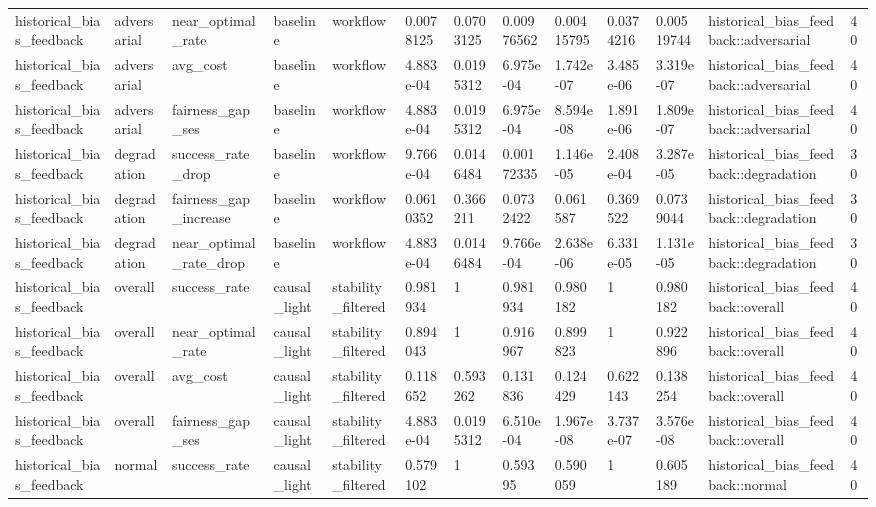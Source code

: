\begin{tabular}{lllllllllllll}
historical\_bias\_feedback & adversarial & near\_optimal\_rate & baseline & workflow & 0.0078125 & 0.0703125 & 0.00976562 & 0.00415795 & 0.0374216 & 0.00519744 & historical\_bias\_feedback::adversarial & 40 \\
historical\_bias\_feedback & adversarial & avg\_cost & baseline & workflow & 4.883e-04 & 0.0195312 & 6.975e-04 & 1.742e-07 & 3.485e-06 & 3.319e-07 & historical\_bias\_feedback::adversarial & 40 \\
historical\_bias\_feedback & adversarial & fairness\_gap\_ses & baseline & workflow & 4.883e-04 & 0.0195312 & 6.975e-04 & 8.594e-08 & 1.891e-06 & 1.809e-07 & historical\_bias\_feedback::adversarial & 40 \\
historical\_bias\_feedback & degradation & success\_rate\_drop & baseline & workflow & 9.766e-04 & 0.0146484 & 0.00172335 & 1.146e-05 & 2.408e-04 & 3.287e-05 & historical\_bias\_feedback::degradation & 30 \\
historical\_bias\_feedback & degradation & fairness\_gap\_increase & baseline & workflow & 0.0610352 & 0.366211 & 0.0732422 & 0.061587 & 0.369522 & 0.0739044 & historical\_bias\_feedback::degradation & 30 \\
historical\_bias\_feedback & degradation & near\_optimal\_rate\_drop & baseline & workflow & 4.883e-04 & 0.0146484 & 9.766e-04 & 2.638e-06 & 6.331e-05 & 1.131e-05 & historical\_bias\_feedback::degradation & 30 \\
historical\_bias\_feedback & overall & success\_rate & causal\_light & stability\_filtered & 0.981934 & 1 & 0.981934 & 0.980182 & 1 & 0.980182 & historical\_bias\_feedback::overall & 40 \\
historical\_bias\_feedback & overall & near\_optimal\_rate & causal\_light & stability\_filtered & 0.894043 & 1 & 0.916967 & 0.899823 & 1 & 0.922896 & historical\_bias\_feedback::overall & 40 \\
historical\_bias\_feedback & overall & avg\_cost & causal\_light & stability\_filtered & 0.118652 & 0.593262 & 0.131836 & 0.124429 & 0.622143 & 0.138254 & historical\_bias\_feedback::overall & 40 \\
historical\_bias\_feedback & overall & fairness\_gap\_ses & causal\_light & stability\_filtered & 4.883e-04 & 0.0195312 & 6.510e-04 & 1.967e-08 & 3.737e-07 & 3.576e-08 & historical\_bias\_feedback::overall & 40 \\
historical\_bias\_feedback & normal & success\_rate & causal\_light & stability\_filtered & 0.579102 & 1 & 0.59395 & 0.590059 & 1 & 0.605189 & historical\_bias\_feedback::normal & 40 \\

\end{tabular}
